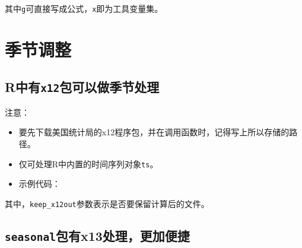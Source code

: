 \documentclass[
]{book}
\newenvironment{Shaded}{\begin{snugshade}}{\end{snugshade}}
\newcommand{\CharTok}[1]{\textcolor[rgb]{0.31,0.60,0.02}{#1}}
\newcommand{\CommentTok}[1]{\textcolor[rgb]{0.56,0.35,0.01}{\textit{#1}}}
\newcommand{\DataTypeTok}[1]{\textcolor[rgb]{0.13,0.29,0.53}{#1}}
\newcommand{\KeywordTok}[1]{\textcolor[rgb]{0.13,0.29,0.53}{\textbf{#1}}}
\newcommand{\NormalTok}[1]{#1}
\newcommand{\OperatorTok}[1]{\textcolor[rgb]{0.81,0.36,0.00}{\textbf{#1}}}
\newcommand{\OtherTok}[1]{\textcolor[rgb]{0.56,0.35,0.01}{#1}}
\newcommand{\StringTok}[1]{\textcolor[rgb]{0.31,0.60,0.02}{#1}}
\providecommand{\tightlist}{%
  \setlength{\itemsep}{0pt}\setlength{\parskip}{0pt}}
\begin{document}
其中\texttt{g}可直接写成公式，\texttt{x}即为工具变量集。

\hypertarget{ux5b63ux8282ux8c03ux6574}{%
\section{季节调整}\label{ux5b63ux8282ux8c03ux6574}}

\hypertarget{rux4e2dux6709x12ux5305ux53efux4ee5ux505aux5b63ux8282ux5904ux7406}{%
\subsection{\texorpdfstring{R中有\texttt{x12}包可以做季节处理}{R中有x12包可以做季节处理}}\label{rux4e2dux6709x12ux5305ux53efux4ee5ux505aux5b63ux8282ux5904ux7406}}

注意：

\begin{itemize}
\tightlist
\item
  要先下载美国统计局的x12程序包，并在调用函数时，记得写上所以存储的路径。
\item
  仅可处理R中内置的时间序列对象\texttt{ts}。
\item
  示例代码：
\end{itemize}

\begin{Shaded}
\end{Shaded}

其中，\texttt{keep\_x12out}参数表示是否要保留计算后的文件。

\hypertarget{seasonalux5305ux6709x13ux5904ux7406ux66f4ux52a0ux4fbfux6377}{%
\subsection{\texorpdfstring{\texttt{seasonal}包有x13处理，更加便捷}{seasonal包有x13处理，更加便捷}}\label{seasonalux5305ux6709x13ux5904ux7406ux66f4ux52a0ux4fbfux6377}}
\end{document}
